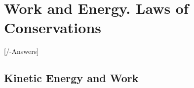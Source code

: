 
\chapter{Work and Energy. Laws of Conservations}\label{\currfilebase}
[\currfilebase/\currfilebase-Answers]
%

\section{Kinetic Energy and Work}




